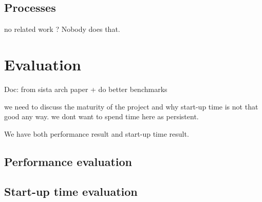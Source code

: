 \documentclass[a4paper,12pt,twoside]{../includes/ThesisStyle}
\begin{document}
\subsection{Processes}

no related work ?
Nobody does that.

\section{Evaluation}

Doc: from sista arch paper + do better benchmarks

we need to discuss the maturity of the project and why start-up time is not that good any way. we dont want to spend time here as persistent.

We have both performance result and start-up time result.

\subsection{Performance evaluation}

\subsection{Start-up time evaluation}

\ifx\wholebook\relax\else
    
\end{document}
